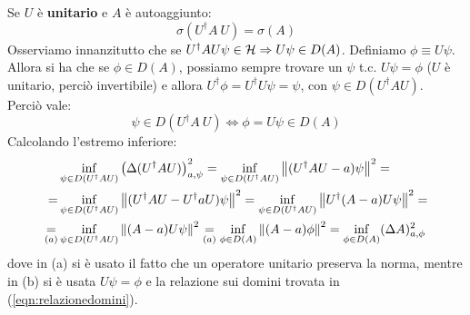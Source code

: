 \documentclass[../../FisicaTeorica.tex]{subfiles}
\begin{document}
\begin{enumerate}
	Se $U$ è \textbf{unitario} e $A$ è autoaggiunto:
	\[
	\sigma \left(U^\dag A\ U\right)= \sigma \left(A\right)
	\]
	Osserviamo innanzitutto che se $U^\dag A U\psi \in \mathcal{H} \Rightarrow U\psi \in D(A)$. Definiamo $\phi \equiv U\psi$.\\
	Allora si ha che se $\phi \in D\left(A\right)$, possiamo sempre trovare un $\psi$ t.c. $U\psi =\phi$ ($U$ è unitario, perciò invertibile) e allora $U^\dag\phi =U^\dag U \psi =\psi$, con $\psi \in D(U^\dag A U)$.\\
	Perciò vale:
	\begin{equation}
	    \psi \in D\left(U^\dag A\ U\right)\Leftrightarrow \phi =U\psi \in D(A)
	    \label{eqn:relazionedomini}
	\end{equation}
	Calcolando l'estremo inferiore:
	\begin{align*}
	   &\inf_{\psi \in D(U^\dag A U)} \left (\Delta(U^\dag A U) \right )^2_{a,\psi}
	   =\inf_{\psi \in D(U^\dagger A U)} \left\lVert(U^\dag A U-a)\psi\right\rVert^2 =\\
	   = &\inf_{\psi \in D(U^\dag A U)} \left\lVert(U^\dag A U - U^\dag a U)\psi\right\rVert^2 = \inf_{\psi \in D(U^\dagger A U)} \left\lVert U^\dag(A-a)U\psi\right\rVert^2 =\\
	   \underset{(a)}{=} &\inf_{\psi \in D(U^\dagger A U)} \left\lVert(A-a)U\psi\right\rVert^2 \underset{(a)}{=} \inf_{\phi \in D(A)} \left\lVert(A-a)\phi\right\rVert^2 = \inf_{\phi \in D(A)} (\Delta A)^2_{a,\phi}
	\end{align*}
	dove in (a) si è usato il fatto che un operatore unitario preserva la norma, mentre in (b) si è usata $U\psi = \phi$ e la relazione sui domini trovata in (\ref{eqn:relazionedomini}).
	

\end{enumerate}
\end{document}
